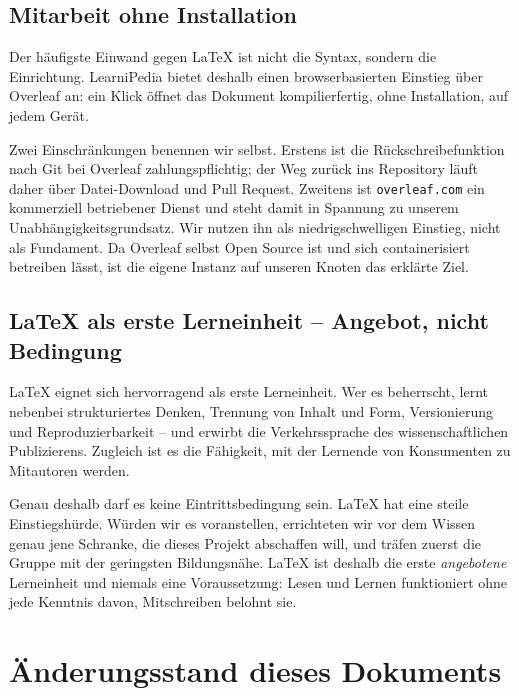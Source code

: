 \documentclass[11pt,a4paper]{article}
\begin{document}
\subsection{Mitarbeit ohne Installation}
Der häufigste Einwand gegen LaTeX ist nicht die Syntax, sondern die Einrichtung. LearniPedia bietet deshalb einen browserbasierten Einstieg über Overleaf an: ein Klick öffnet das Dokument kompilierfertig, ohne Installation, auf jedem Gerät.

Zwei Einschränkungen benennen wir selbst. Erstens ist die Rückschreibefunktion nach Git bei Overleaf zahlungspflichtig; der Weg zurück ins Repository läuft daher über Datei-Download und Pull Request. Zweitens ist \texttt{overleaf.com} ein kommerziell betriebener Dienst und steht damit in Spannung zu unserem Unabhängigkeitsgrundsatz. Wir nutzen ihn als niedrigschwelligen Einstieg, nicht als Fundament. Da Overleaf selbst Open Source ist und sich containerisiert betreiben lässt, ist die eigene Instanz auf unseren Knoten das erklärte Ziel.

\subsection{LaTeX als erste Lerneinheit -- Angebot, nicht Bedingung}
LaTeX eignet sich hervorragend als erste Lerneinheit. Wer es beherrscht, lernt nebenbei strukturiertes Denken, Trennung von Inhalt und Form, Versionierung und Reproduzierbarkeit -- und erwirbt die Verkehrssprache des wissenschaftlichen Publizierens. Zugleich ist es die Fähigkeit, mit der Lernende von Konsumenten zu Mitautoren werden.

Genau deshalb darf es keine Eintrittsbedingung sein. LaTeX hat eine steile Einstiegshürde. Würden wir es voranstellen, errichteten wir vor dem Wissen genau jene Schranke, die dieses Projekt abschaffen will, und träfen zuerst die Gruppe mit der geringsten Bildungsnähe. LaTeX ist deshalb die erste \textit{angebotene} Lerneinheit und niemals eine Voraussetzung: Lesen und Lernen funktioniert ohne jede Kenntnis davon, Mitschreiben belohnt sie.

\section{Änderungsstand dieses Dokuments}
\end{document}
